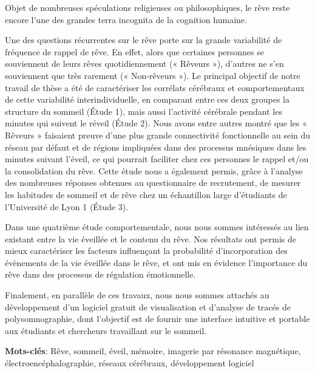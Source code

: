 Objet de nombreuses spéculations religieuses ou philosophiques, le rêve reste encore l'une des grandes terra incognita de la cognition humaine.

Une des questions récurrentes sur le rêve porte sur la grande variabilité de fréquence de rappel de rêve. En effet, alors que certaines personnes se souviennent de leurs rêves quotidiennement (« Rêveurs »), d’autres ne s’en souviennent que très rarement (« Non-rêveurs »). Le principal objectif de notre travail de thèse a été de caractériser les corrélats cérébraux et comportementaux de cette variabilité interindividuelle, en comparant entre ces deux groupes la structure du sommeil (Étude 1), mais aussi l’activité cérébrale pendant les minutes qui suivent le réveil (Étude 2). Nous avons entre autres montré que les « Rêveurs » faisaient preuve d’une plus grande connectivité fonctionnelle au sein du réseau par défaut et de régions impliquées dans des processus mnésiques dans les minutes suivant l’éveil, ce qui pourrait faciliter chez ces personnes le rappel et/ou la consolidation du rêve. Cette étude nous a également permis, grâce à l’analyse des nombreuses réponses obtenues au questionnaire de recrutement, de mesurer les habitudes de sommeil et de rêve chez un échantillon large d’étudiants de l’Université de Lyon 1 (Étude 3).

Dans une quatrième étude comportementale, nous nous sommes intéressés au lien existant entre la vie éveillée et le contenu du rêve. Nos résultats ont permis de mieux caractériser les facteurs influençant la probabilité d’incorporation des évènements de la vie éveillée dans le rêve, et ont mis en évidence l’importance du rêve dans des processus de régulation émotionnelle.

Finalement, en parallèle de ces travaux, nous nous sommes attachés au développement d’un logiciel gratuit de visualisation et d’analyse de tracés de polysomnographie, dont l’objectif est de fournir une interface intuitive et portable aux étudiants et chercheurs travaillant sur le sommeil.

\textbf{Mots-clés}: Rêve, sommeil, éveil, mémoire, imagerie par résonance magnétique, électroencéphalographie, réseaux cérébraux, développement logiciel
